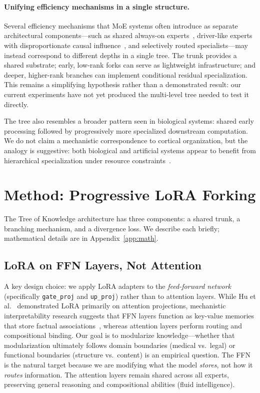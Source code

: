 \documentclass{article}
\newcommand{\tok}{Tree of Knowledge}
\begin{document}
\paragraph{Unifying efficiency mechanisms in a single structure.}
Several efficiency mechanisms that MoE systems often introduce as separate
architectural components---such as shared always-on
experts~\cite{deepseek2024moe}, driver-like experts with disproportionate
causal influence~\cite{domaindriver2026}, and selectively routed
specialists---may instead correspond to different depths in a single tree. The
trunk provides a shared substrate; early, low-rank forks can serve as
lightweight infrastructure; and deeper, higher-rank branches can implement
conditional residual specialization. This remains a simplifying hypothesis
rather than a demonstrated result: our current experiments have not yet
produced the multi-level tree needed to test it directly.

The tree also resembles a broader pattern seen in biological systems: shared
early processing followed by progressively more specialized downstream
computation. We do not claim a mechanistic correspondence to cortical
organization, but the analogy is suggestive: both biological and artificial
systems appear to benefit from hierarchical specialization under resource
constraints~\cite{bena2025modularity}.

\section{Method: Progressive LoRA Forking}
\label{sec:method}

The \tok{} architecture has three components: a shared trunk, a branching
mechanism, and a divergence loss. We describe each briefly; mathematical details
are in Appendix~\ref{app:math}.

\subsection{LoRA on FFN Layers, Not Attention}

A key design choice: we apply LoRA adapters to the \emph{feed-forward network}
(specifically \texttt{gate\_proj} and \texttt{up\_proj}) rather than to
attention layers. While Hu et al.~\cite{hu2022lora} demonstrated LoRA
primarily on attention projections, mechanistic interpretability research
suggests that FFN layers function as key-value memories that store factual
associations~\cite{geva2021transformer}, whereas attention layers perform
routing and compositional binding. Our goal is to modularize knowledge---whether that modularization ultimately
follows domain boundaries (medical vs.\ legal) or functional boundaries
(structure vs.\ content) is an empirical question. The FFN is the natural
target because we are modifying what the model \emph{stores}, not how it
\emph{routes} information. The attention layers remain shared across all
experts, preserving general reasoning and compositional abilities (fluid
intelligence).
\end{document}
